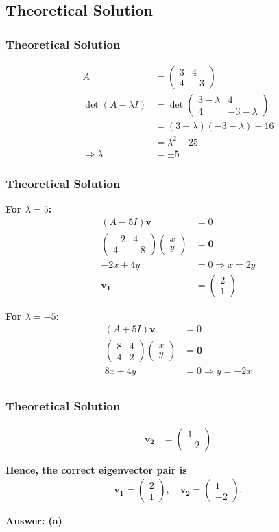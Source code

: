 \documentclass{beamer}
\theoremstyle{remark}
\newcommand{\myvec}[1]{\ensuremath{\begin{pmatrix}#1\end{pmatrix}}}
\let\vec\mathbf
\numberwithin{equation}{section}
\begin{document}
\subsection{Theoretical Solution }
\begin{frame}
\frametitle{Theoretical Solution}
\begin{align}
A &= \myvec{3 & 4 \\ 4 & -3} \\[6pt]
\det(A - \lambda I) &= 
\det\myvec{3-\lambda & 4 \\ 4 & -3-\lambda} \\[6pt]
&= (3-\lambda)(-3-\lambda) - 16 \\[6pt]
&= \lambda^2 - 25 \\[6pt]
\Rightarrow \lambda &= \pm 5
\end{align}


\end{frame}

\begin{frame}
\frametitle{Theoretical Solution}
\textbf{For $\lambda = 5$:}
\begin{align}
(A - 5I)\vec{v} &= 0 \\[6pt]
\myvec{-2 & 4 \\ 4 & -8}\myvec{x \\ y} &= \vec{0} \\[6pt]
-2x + 4y &= 0 \Rightarrow x = 2y \\[6pt]
\vec{v_1} &= \myvec{2 \\ 1}
\end{align}

\textbf{For $\lambda = -5$:}
\begin{align}
(A + 5I)\vec{v} &= 0 \\[6pt]
\myvec{8 & 4 \\ 4 & 2}\myvec{x \\ y} &= \vec{0} \\[6pt]
8x + 4y &= 0 \Rightarrow y = -2x \\[6pt]
\end{align}

\end{frame}

\begin{frame}
\frametitle{Theoretical Solution}
\begin{align}
    \vec{v_2} &= \myvec{1 \\ -2}
\end{align}

\textbf{Hence, the correct eigenvector pair is}
\begin{align}
\vec{v_1} = \myvec{2 \\ 1}, \quad \vec{v_2} = \myvec{1 \\ -2}.
\end{align}

\textbf{Answer: (a)}

\end{frame}
\end{document}
